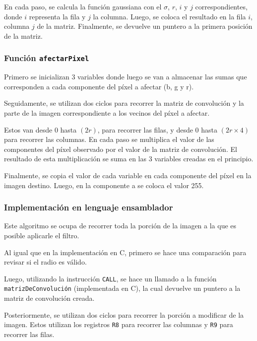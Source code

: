         En cada paso, se calcula la función gaussiana con el $\sigma$, $r$, $i$ y $j$ correspondientes, donde $i$ representa la fila y $j$ la columna. Luego, se coloca el resultado en la fila $i$, columna $j$ de la matriz. Finalmente, se devuelve un puntero a la primera posición de la matriz.

      \subsubsection*{Función \texttt{afectarPixel}}
        Primero se inicializan 3 variables donde luego se van a almacenar las sumas que corresponden a cada componente del píxel a afectar (\textsf{b}, \textsf{g} y \textsf{r}). 

        Seguidamente, se utilizan dos ciclos para recorrer la matriz de convolución y la parte de la imagen correspondiente a los vecinos del píxel a afectar. 
        
        Estos van desde $0$ hasta $(2r)$, para recorrer las filas, y desde $0$ hasta $(2r \times 4)$ para recorrer las columnas. En cada paso se multiplica el valor de las componentes del píxel observado por el valor de la matriz de convolución. El resultado de esta multiplicación se suma en las 3 variables creadas en el principio. 
        
        Finalmente, se copia el valor de cada variable en cada componente del píxel en la imagen destino. Luego, en la componente \textsf{a} se coloca el valor 255.  

    \subsubsection{Implementación en lenguaje ensamblador} 
      Este algoritmo se ocupa de recorrer toda la porción de la imagen a la que es posible aplicarle el filtro. 
      
      Al igual que en la implementación en C, primero se hace una comparación para revisar si el radio es válido. 
      
      Luego, utilizando la instrucción \texttt{CALL}, se hace un llamado a la función \texttt{matrizDeConvolución} (implementada en C), la cual devuelve un puntero a la matriz de convolución creada. 
      
      Posteriormente, se utilizan dos ciclos para recorrer la porción a modificar de la imagen. Estos utilizan los registros \texttt{R8} para recorrer las columnas y \texttt{R9} para recorrer las filas.


